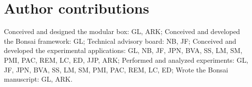 
\section{Author contributions}

Conceived and designed the modular box: GL, ARK; Conceived and developed the Bonsai framework: GL; Technical advisory board: NB, JF; Conceived and developed the experimental applications: GL, NB, JF, JPN, BVA, SS, LM, SM, PMI, PAC, REM, LC, ED, JJP, ARK; Performed and analyzed experiments: GL, JF, JPN, BVA, SS, LM, SM, PMI, PAC, REM, LC, ED; Wrote the Bonsai manuscript: GL, ARK.
